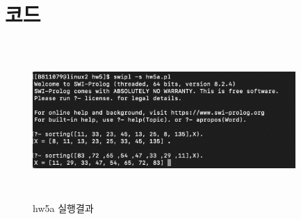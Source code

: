 \documentclass{article}
\begin{document}
\section{코드}
\begin{figure}[h]
    \centering
    \includegraphics[width = 10cm,height = 6cm]{hw5a_run.png}
    \caption{hw5a 실행결과}
    \label{fig:fig1}
\end{figure}
\end{document}
